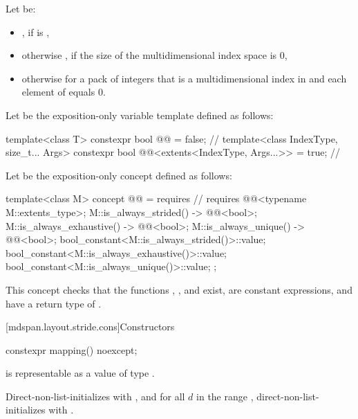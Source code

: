 \pnum
Let  be:
\begin{itemize}
\item
{}, if  is ,
\item
otherwise , if the size of the multidimensional index space  is 0,
\item
otherwise  for a pack of integers 
that is a multidimensional index in  and
each element of  equals 0.
\end{itemize}

\pnum
Let  be the exposition-only variable template
defined as follows:
\begin{codeblock}
template<class T>
  constexpr bool @@ = false;                              // \expos
template<class IndexType, size_t... Args>
  constexpr bool @@<extents<IndexType, Args...>> = true;  // \expos
\end{codeblock}

\pnum
Let  be the exposition-only concept
defined as follows:
\begin{codeblock}
template<class M>
concept @@ = requires {                         // \expos
  requires @@<typename M::extents_type>;
  { M::is_always_strided() } -> @@<bool>;
  { M::is_always_exhaustive() } -> @@<bool>;
  { M::is_always_unique() } -> @@<bool>;
  bool_constant<M::is_always_strided()>::value;
  bool_constant<M::is_always_exhaustive()>::value;
  bool_constant<M::is_always_unique()>::value;
};
\end{codeblock}
\begin{note}
This concept checks that the functions
,
, and
 exist,
are constant expressions, and
have a return type of .
\end{note}

[mdspan.layout.stride.cons]{Constructors}

%
\begin{itemdecl}
constexpr mapping() noexcept;
\end{itemdecl}

\begin{itemdescr}
\pnum
\expects
{}
is representable as a value of type .

\pnum
\effects
Direct-non-list-initializes  with , and
for all $d$ in the range ,
direct-non-list-initializes  with
.
\end{itemdescr}

